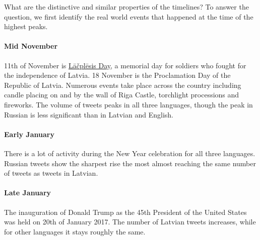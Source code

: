 \documentclass[11pt,a4paper]{article}
\begin{document}

What are the distinctive and similar properties of the timelines? To answer the question, we first identify the real world events that happened at the time of the highest peaks.

\paragraph{Mid November}

11th of November is \href{https://en.wikipedia.org/wiki/L\%C4\%81\%C4\%8Dpl\%C4\%93sis_Day}{L\={a}\v{c}pl\={e}sis Day}, a memorial day for soldiers who fought for the independence of Latvia. 18 November is the Proclamation Day of the Republic of Latvia. Numerous events take place across the country including candle placing on and by the wall of Riga Castle, torchlight processions and fireworks. The volume of tweets peaks in all three languages, though the peak in Russian is less significant than in Latvian and English.



\paragraph{Early January}

There is a lot of activity during the New Year celebration for all three languages. Russian tweets show the sharpest rise the most almost reaching the same number of tweets as tweets in Latvian.

\paragraph{Late January}



The inauguration of Donald Trump as the 45th President of the United States was held on 20th of January 2017. The number of Latvian tweets increases, while for other languages it stays roughly the same.
\end{document}

